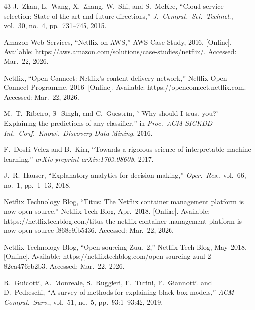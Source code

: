 \documentclass[journal]{IEEEtran}
\begin{document}
\begin{thebibliography}{43}
J.~Zhan, L.~Wang, X.~Zhang, W.~Shi, and S.~McKee, ``Cloud service selection:
  State-of-the-art and future directions,'' \emph{J.\ Comput.\ Sci.\ Technol.},
  vol.~30, no.~4, pp.~731--745, 2015.

Amazon Web Services, ``Netflix on AWS,'' AWS Case Study, 2016. [Online].
  Available: https://aws.amazon.com/solutions/case-studies/netflix/. Accessed:
  Mar.~22, 2026.

Netflix, ``Open Connect: Netflix's content delivery network,'' Netflix Open
  Connect Programme, 2016. [Online]. Available: https://openconnect.netflix.com.
  Accessed: Mar.~22, 2026.

M.~T.~Ribeiro, S.~Singh, and C.~Guestrin, ```Why should I trust you?'
  Explaining the predictions of any classifier,'' in \emph{Proc.\ ACM SIGKDD
  Int.\ Conf.\ Knowl.\ Discovery Data Mining}, 2016.

F.~Doshi-Velez and B.~Kim, ``Towards a rigorous science of interpretable
  machine learning,'' \emph{arXiv preprint arXiv:1702.08608}, 2017.

J.~R.~Hauser, ``Explanatory analytics for decision making,'' \emph{Oper.\ Res.},
  vol.~66, no.~1, pp.~1--13, 2018.

Netflix Technology Blog, ``Titus: The Netflix container management platform is
  now open source,'' Netflix Tech Blog, Apr.~2018. [Online]. Available:
  https://netflixtechblog.com/titus-the-netflix-container-management-platform-is-now-open-source-f868c9fb5436.
  Accessed: Mar.~22, 2026.

Netflix Technology Blog, ``Open sourcing Zuul~2,'' Netflix Tech Blog,
  May~2018. [Online]. Available:
  https://netflixtechblog.com/open-sourcing-zuul-2-82ea476cb2b3.
  Accessed: Mar.~22, 2026.

R.~Guidotti, A.~Monreale, S.~Ruggieri, F.~Turini, F.~Giannotti, and
  D.~Pedreschi, ``A survey of methods for explaining black box models,''
  \emph{ACM Comput.\ Surv.}, vol.~51, no.~5, pp.~93:1--93:42, 2019.


\end{thebibliography}
\end{document}
